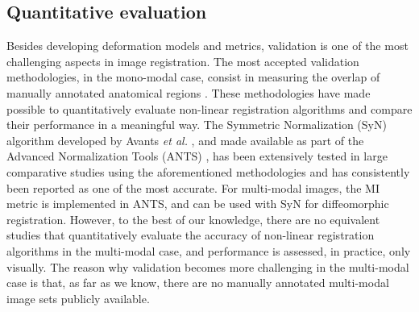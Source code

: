 \closer
\subsection{Quantitative evaluation}
Besides developing deformation models and metrics, validation is one of the most challenging aspects in image registration. The most accepted validation methodologies, in the mono-modal case, consist in measuring the overlap of manually annotated anatomical regions \citep{Klein2009, Klein2010, Rohlfing2012}. These methodologies have made possible to quantitatively evaluate non-linear registration algorithms and compare their performance in a meaningful way. The Symmetric Normalization (SyN) algorithm developed by Avants {\it et al.} \cite{Avants2008, Avants2011}, and made available as part of the Advanced Normalization Tools (ANTS) \citep{Avants2011a}, has been extensively tested in large comparative studies using the aforementioned methodologies and has consistently been reported as one of the most accurate. For multi-modal images, the MI metric is implemented in ANTS, and can be used with SyN for diffeomorphic registration. However, to the best of our knowledge, there are no equivalent studies that quantitatively evaluate the accuracy of non-linear registration algorithms in the multi-modal case, and performance is assessed, in practice, only visually. The reason why validation becomes more challenging in the multi-modal case is that, as far as we know, there are no manually annotated multi-modal image sets publicly available.

\closer
